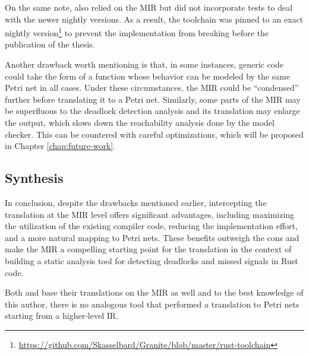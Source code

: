 \documentclass[../Thesis.tex]{subfiles}
\begin{document}
On the same note, \cite{meyer2020} also relied on the \acrshort{MIR}
but did not incorporate tests to deal with the newer nightly versions.
As a result, the toolchain was pinned to an exact nightly
version\footnote{\url{https://github.com/Skasselbard/Granite/blob/master/rust-toolchain}}
to prevent the implementation from breaking before the publication of the thesis.

Another drawback worth mentioning is that, in some instances,
generic code could take the form of a function whose behavior can be modeled
by the same Petri net in all cases.
Under these circumstances, the \acrshort{MIR} could be ``condensed'' further
before translating it to a Petri net.
Similarly, some parts of the \acrshort{MIR} may be superfluous
to the deadlock detection analysis and its translation may enlarge the output,
which slows down the reachability analysis done by the model checker.
This can be countered with careful optimizations,
which will be proposed in Chapter \ref{chap:future-work}.

\subsection{Synthesis}

In conclusion, despite the drawbacks mentioned earlier,
intercepting the translation at the \acrshort{MIR} level offers significant advantages,
including maximizing the utilization of the existing compiler code,
reducing the implementation effort, and a more natural mapping to Petri nets.
These benefits outweigh the cons and make the \acrshort{MIR}
a compelling starting point for the translation
in the context of building a static analysis tool
for detecting deadlocks and missed signals in Rust code.

Both \cite{meyer2020} and \cite{zhang2022deadlocks} base their translations
on the \acrshort{MIR} as well and to the best knowledge of this author, there is
no analogous tool that performed a translation to Petri nets
starting from a higher-level \acrshort{IR}.
\end{document}
